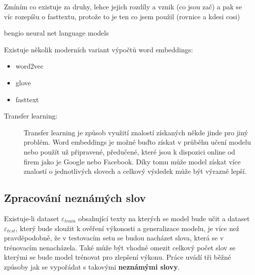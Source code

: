 


Zmíním co existuje za druhy, lehce jejich rozdíly a vznik (co jsou zač) a pak se víc rozepíšu o fasttextu, protože to je ten co jsem použil (rovnice a kdesi cosi)


bengio neural net language models\cite{Bengio:2008}


Existuje několik moderních variant výpočtů word embeddings:
\begin{itemize}
  \item word2vec \cite{word2vec}
  \item glove  \cite{glove}
  \item fasttext \cite{fasttext}
\end{itemize}

\begin{description}
  \item[Transfer learning:] Transfer learning je způsob využití znalostí získaných někde jinde pro jiný problém. Word embeddings je možné buďto získat v průběhu učení modelu nebo použít už připravené, předučené, které jsou k dispozici online od firem jako je Google nebo Facebook. Díky tomu může model získat více znalostí o jednotlivých slovech a celkový výsledek může být výrazně lepší.
\end{description}

\subsection{Zpracování neznámých slov} \label{subsection:oov}
Existuje-li dataset $\varepsilon_{train}$ obsahující texty na kterých se model bude učit a dataset $\varepsilon_{test}$, který bude sloužit k ověření výkonosti a generalizace modelu, je více než pravděpodobně, že v testovacím setu se budou nacházet slova, která se v trénovacím nenacházela. Také může být vhodné omezit celkový počet slov se kterými se bude model trénovat pro zlepšení výkonu. Práce \cite{nmtTutorial} uvádí tři běžné způsoby jak se vypořádat s takovými \textbf{neznámými slovy}.

